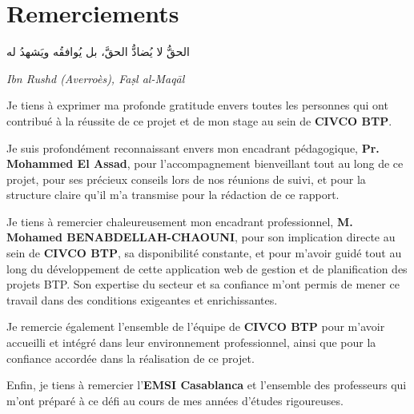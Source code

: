 
\chapter*{Remerciements}
\thispagestyle{plain}

\begin{center}
  \begin{arabicblock}
    الحقُّ لا يُضادُّ الحقَّ، بل يُوافقُه ويَشهدُ له
  \end{arabicblock}
  \textit{Ibn Rushd (Averroès), Faṣl al-Maqāl}
\end{center}

\bigskip

Je tiens à exprimer ma profonde gratitude envers toutes les personnes qui ont contribué à la
réussite de ce projet et de mon stage au sein de \textbf{CIVCO BTP}.

\medskip

Je suis profondément reconnaissant envers mon encadrant pédagogique,
\textbf{Pr. Mohammed El Assad}, pour l'accompagnement bienveillant tout
au long de ce projet, pour ses précieux conseils lors de nos réunions de suivi, et pour la
structure claire qu'il m'a transmise pour la rédaction de ce rapport.

\medskip

Je tiens à remercier chaleureusement mon encadrant professionnel,
\textbf{M. Mohamed BENABDELLAH-CHAOUNI}, pour son implication directe au sein de
\textbf{CIVCO BTP}, sa disponibilité constante, et pour m'avoir guidé tout au long du
développement de cette application web de gestion et de planification des projets BTP.
Son expertise du secteur et sa confiance m'ont permis de mener ce travail dans des
conditions exigeantes et enrichissantes.

\medskip

Je remercie également l'ensemble de l'équipe de \textbf{CIVCO BTP} pour m'avoir accueilli
et intégré dans leur environnement professionnel, ainsi que pour la confiance accordée
dans la réalisation de ce projet.

\medskip

Enfin, je tiens à remercier l'\textbf{EMSI Casablanca} et l'ensemble des professeurs qui m'ont
préparé à ce défi au cours de mes années d'études rigoureuses.

\newpage
